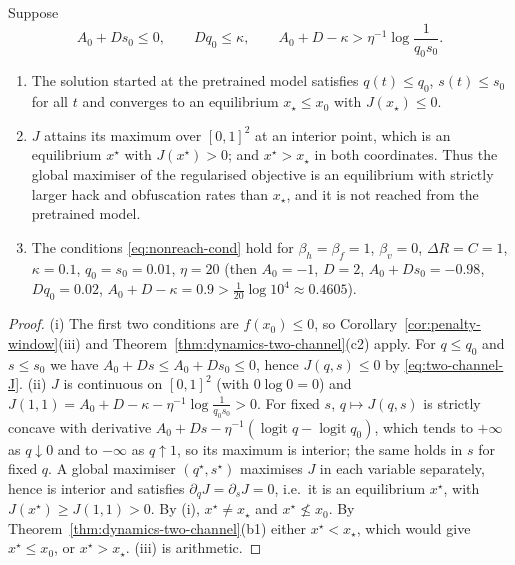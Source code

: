 \begin{proposition}
\label{prop:nonreach}
Suppose
\begin{equation}\label{eq:nonreach-cond}
A_0+Ds_0\le0,\qquad Dq_0\le\kappa,\qquad
A_0+D-\kappa>\eta^{-1}\log\frac{1}{q_0s_0}.
\end{equation}
\begin{enumerate}
\item[\textup{(i)}] The solution started at the pretrained model satisfies
$q(t)\le q_0$, $s(t)\le s_0$ for all $t$ and converges to an equilibrium
$x_\star\le x_0$ with $J(x_\star)\le0$.
\item[\textup{(ii)}] $J$ attains its maximum over $[0,1]^2$ at an interior
point, which is an equilibrium $x^\star$ with $J(x^\star)>0$; and
$x^\star>x_\star$ in both coordinates. Thus the global maximiser of the regularised
objective is an equilibrium with strictly larger hack and obfuscation
rates than $x_\star$, and it is not reached from the pretrained model.
\item[\textup{(iii)}] The conditions \eqref{eq:nonreach-cond} hold for
$\beta_h=\beta_f=1$, $\beta_v=0$, $\Delta R=C=1$, $\kappa=0.1$,
$q_0=s_0=0.01$, $\eta=20$ (then $A_0=-1$, $D=2$,
$A_0+Ds_0=-0.98$, $Dq_0=0.02$, $A_0+D-\kappa=0.9>\frac{1}{20}\log10^4\approx0.4605$).
\end{enumerate}
\end{proposition}

\begin{proof}
(i) The first two conditions are $f(x_0)\le0$, so
Corollary~\ref{cor:penalty-window}(iii) and
Theorem~\ref{thm:dynamics-two-channel}(c2) apply. For $q\le q_0$ and
$s\le s_0$ we have $A_0+Ds\le A_0+Ds_0\le0$, hence
$J(q,s)\le0$ by \eqref{eq:two-channel-J}. (ii) $J$ is continuous on
$[0,1]^2$ (with $0\log0=0$) and
$J(1,1)=A_0+D-\kappa-\eta^{-1}\log\frac1{q_0s_0}>0$. For fixed $s$,
$q\mapsto J(q,s)$ is strictly concave with derivative
$A_0+Ds-\eta^{-1}(\operatorname{logit}q-\operatorname{logit}q_0)$, which
tends to $+\infty$ as $q\downarrow0$ and to $-\infty$ as $q\uparrow1$, so
its maximum is interior; the same holds in $s$ for fixed $q$. A global
maximiser $(q^\star,s^\star)$ maximises $J$ in each variable separately,
hence is interior and satisfies $\partial_qJ=\partial_sJ=0$, i.e.\ it is an
equilibrium $x^\star$, with $J(x^\star)\ge J(1,1)>0$. By (i),
$x^\star\ne x_\star$ and $x^\star\not\le x_0$. By
Theorem~\ref{thm:dynamics-two-channel}(b1) either $x^\star<x_\star$, which
would give $x^\star\le x_0$, or $x^\star>x_\star$. (iii) is arithmetic.
\end{proof}


